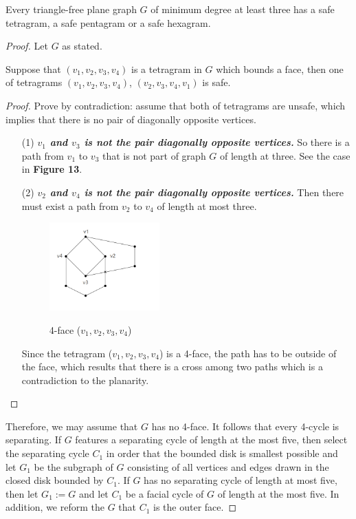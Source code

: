 \begin{lemma}
Every triangle-free plane graph $G$ of minimum degree at least three has a safe tetragram, a safe pentagram or a safe hexagram. \cite{dvorak2013threecoloring}
\end{lemma}
\begin{proof}
Let $G$ as stated. 

\begin{claim}
Suppose that $(v_1, v_2, v_3, v_4)$ is a tetragram in $G$ which bounds a face, then one of tetragrams $(v_1, v_2, v_3, v_4)$, $(v_2, v_3, v_4, v_1)$ is safe.
\end{claim}

\begin{proof}
Prove by contradiction: assume that both of tetragrams are unsafe, which implies that there is no pair of diagonally opposite vertices.
\begin{itemize}
    \item[(1)] \textit{\textbf{$v_1$ and $v_3$ is not the pair diagonally opposite vertices.}} So there is a path from $v_1$ to $v_3$ that is not part of graph $G$ of length at three. See the case in \textbf{Figure 13}.
    \item[(2)] \textit{\textbf{$v_2$ and $v_4$ is not the pair diagonally opposite vertices.}} Then there must exist a path from $v_2$ to $v_4$ of length at most three. 
    \begin{figure}[H] %
    \centering %
    \includegraphics[width=0.4\textwidth]{figure/4face.png} 
    \label{figure} %
    \caption{4-face ($v_1, v_2, v_3, v_4$)}
    \end{figure}
    Since the tetragram ($v_1, v_2, v_3, v_4$) is a 4-face, the path has to be outside of the face, which results that there is a cross among two paths which is a contradiction to the planarity.
\end{itemize}
\end{proof}
Therefore, we may assume that $G$ has no 4-face. It follows that every 4-cycle is separating. If $G$ features a separating cycle of length at the most five, then select the separating cycle $C_1$ in order that the bounded disk is smallest possible and let $G_1$ be the subgraph of $G$ consisting of all vertices and edges drawn in the closed disk bounded by $C_1$. If $G$ has no separating cycle of length at most five, then let $G_1 := G$ and let $C_1$ be a facial cycle of $G$ of length at the most five. In addition, we reform the $G$ that $C_1$ is the outer face.


\end{proof}
